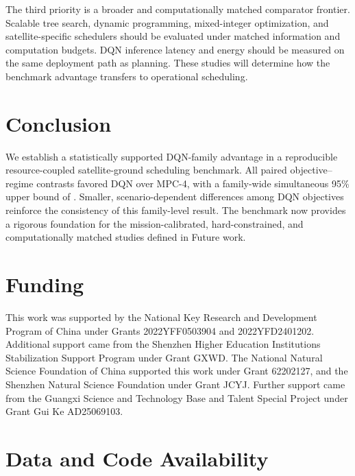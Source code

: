 \documentclass[11pt]{article}
\begin{document}
The third priority is a broader and computationally matched comparator frontier. Scalable tree search, dynamic programming, mixed-integer optimization, and satellite-specific schedulers should be evaluated under matched information and computation budgets. DQN inference latency and energy should be measured on the same deployment path as planning. These studies will determine how the benchmark advantage transfers to operational scheduling.

\section{Conclusion}

We establish a statistically supported DQN-family advantage in a reproducible resource-coupled satellite-ground scheduling benchmark. All \DQNvsMPCContrastCount{} paired objective--regime contrasts favored DQN over MPC-4, with a family-wide simultaneous 95\% upper bound of \DQNvsMPCGlobalUpperBound. Smaller, scenario-dependent differences among DQN objectives reinforce the consistency of this family-level result. The benchmark now provides a rigorous foundation for the mission-calibrated, hard-constrained, and computationally matched studies defined in Future work.

\section*{Funding}

This work was supported by the National Key Research and Development Program of China under Grants 2022YFF0503904 and 2022YFD2401202. Additional support came from the Shenzhen Higher Education Institutions Stabilization Support Program under Grant GXWD. The National Natural Science Foundation of China supported this work under Grant 62202127, and the Shenzhen Natural Science Foundation under Grant JCYJ. Further support came from the Guangxi Science and Technology Base and Talent Special Project under Grant Gui Ke AD25069103.

\section*{Data and Code Availability}
\end{document}
